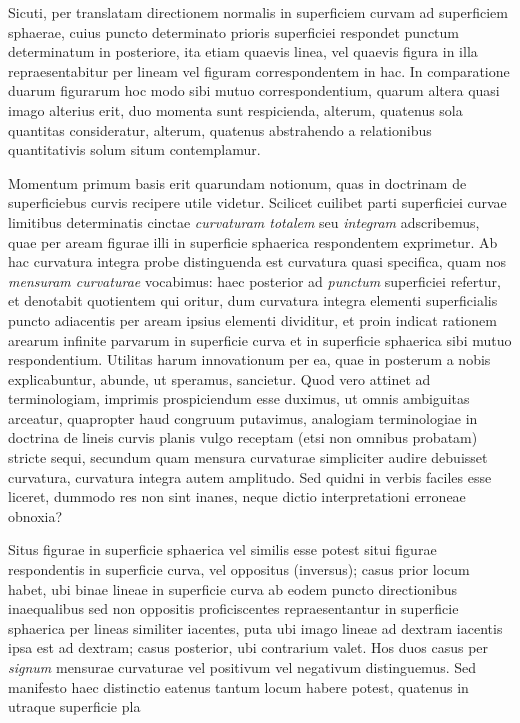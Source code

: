 %
\indent Sicuti, per translatam directionem normalis in superficiem curvam ad superficiem sphaerae, cuius puncto determinato prioris superficiei respondet punctum determinatum in posteriore, ita etiam quaevis linea, vel quaevis figura in illa repraesentabitur per lineam vel figuram correspondentem in hac. In comparatione duarum figurarum hoc modo sibi mutuo correspondentium, quarum altera quasi imago alterius erit, duo momenta sunt respicienda, alterum, quatenus sola quantitas consideratur, alterum, quatenus abstrahendo a relationibus quantitativis solum situm contemplamur.

Momentum primum basis erit quarundam notionum, quas in doctrinam de superficiebus curvis recipere utile videtur. Scilicet cuilibet parti superficiei curvae limitibus determinatis cinctae \textit{curvaturam totalem} seu \textit{integram} adscribemus, quae per aream figurae illi in superficie sphaerica respondentem exprimetur. Ab hac curvatura integra probe distinguenda est curvatura quasi specifica, quam nos \textit{mensuram curvaturae} vocabimus: haec posterior ad \textit{punctum} superficiei refertur, et denotabit quotientem qui oritur, dum curvatura integra elementi superficialis puncto adiacentis per aream ipsius elementi dividitur, et proin indicat rationem arearum infinite parvarum in superficie curva et in superficie sphaerica sibi mutuo respondentium. Utilitas harum innovationum per ea, quae in posterum a nobis explicabuntur, abunde, ut speramus, sancietur. Quod vero attinet ad terminologiam, imprimis prospiciendum esse duximus, ut omnis ambiguitas arceatur, quapropter haud congruum putavimus, analogiam terminologiae in doctrina de lineis curvis planis vulgo receptam (etsi non omnibus probatam) stricte sequi, secundum quam mensura curvaturae simpliciter audire debuisset curvatura, curvatura integra autem amplitudo. Sed quidni in verbis faciles esse liceret, dummodo res non sint inanes, neque dictio interpretationi erroneae obnoxia?

Situs figurae in superficie sphaerica vel similis esse potest situi figurae respondentis in superficie curva, vel oppositus (inversus); casus prior locum habet, ubi binae lineae in superficie curva ab eodem puncto directionibus inaequalibus sed non oppositis proficiscentes repraesentantur in superficie sphaerica per lineas similiter iacentes, puta ubi imago lineae ad dextram iacentis ipsa est ad dextram; casus posterior, ubi contrarium valet. Hos duos casus per \textit{signum} mensurae curvaturae vel positivum vel negativum distinguemus. Sed manifesto haec distinctio eatenus tantum locum habere potest, quatenus in utraque superficie pla%

